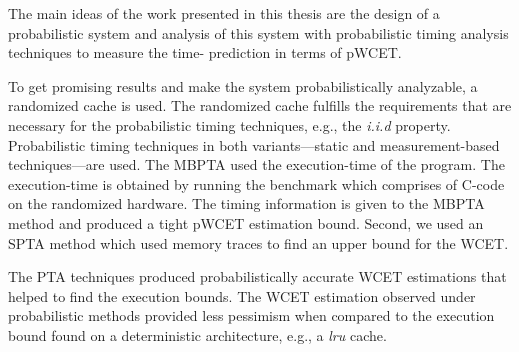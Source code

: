 The main ideas of the work presented in this thesis are the design of a probabilistic system and analysis of this system with probabilistic timing analysis techniques to measure the time- prediction in terms of pWCET. 

To get promising results and make the system probabilistically analyzable, a randomized cache is used. The randomized cache fulfills the requirements that are necessary for the probabilistic timing techniques, e.g., the \textit{i.i.d} property. Probabilistic timing techniques in both variants---static and measurement-based techniques---are used. The MBPTA used the execution-time of the program. The execution-time is obtained by running the benchmark which comprises of C-code on the randomized hardware. The timing information is given to the MBPTA method and produced a tight pWCET estimation bound. Second, we used an SPTA method which used memory traces to find an upper bound for the WCET.  

The PTA techniques produced probabilistically accurate WCET estimations that helped to find the execution bounds. The  WCET estimation observed under probabilistic methods provided less pessimism when compared to the execution bound found on a deterministic architecture, e.g., a \textit{lru} cache.
    
    
    
